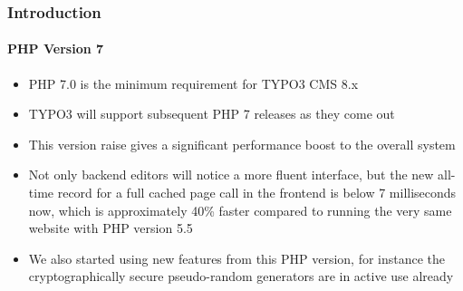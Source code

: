 \begin{frame}[fragile]
	\frametitle{Introduction}
	\framesubtitle{PHP Version 7}

	\begin{itemize}

		\item PHP 7.0 is the minimum requirement for TYPO3 CMS 8.x
		\item TYPO3 will support subsequent PHP 7 releases as they come out
		\item This version raise gives a significant performance boost to the overall system

		\item Not only backend editors will notice a more fluent interface, but the
			new all-time record for a full cached page call in the frontend is below
			7 milliseconds now, which is approximately 40\% faster compared to running
			the very same website with PHP version 5.5

		\item We also started using new features from this PHP version, for instance
			the cryptographically secure pseudo-random generators are in active use already

	\end{itemize}

\end{frame}

